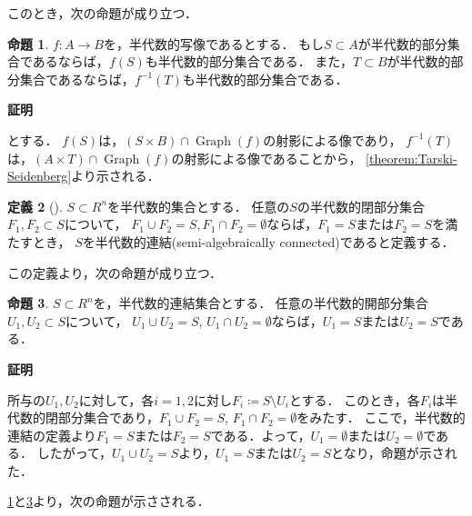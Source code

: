 \documentclass[uplatex, dvipdfmx]{jsarticle}
\makeatletter
\numberwithin{equation}{section}
\renewenvironment{proof}[1][\proofname]{\par
  \pushQED{\qed}%
  \normalfont \topsep6\p@\@plus6\p@\relax
  \trivlist
  \item\relax
  {\bfseries
  #1\@addpunct{.}}\hspace\labelsep\ignorespaces
}{
  \popQED\endtrivlist\@endpefalse
}
\newcommand{\map}[3]{{#1}\colon{#2}\rightarrow{#3}}
\DeclareMathOperator{\Graph}{Graph}
\theoremstyle{definition}
\newtheorem{definition}{定義}[section]
\newtheorem{proposition}[definition]{命題}
\renewcommand{\proofname}{\textbf{証明}}
\makeatother
\begin{document}
このとき，次の命題が成り立つ．

\begin{proposition}\label{proposition:image-preimage}
     $\map{f}{A}{B}$を，半代数的写像であるとする．
     もし$S \subset A$が半代数的部分集合であるならば，$f(S)$も半代数的部分集合である．
     また，$T \subset B$が半代数的部分集合であるならば，$f^{-1}(T)$も半代数的部分集合である．
\end{proposition}

\begin{proof}
     とする．
     $f(S)$は，$(S \times B) \cap \Graph(f)$の射影による像であり，
     $f^{-1}(T)$は，$(A \times T) \cap \Graph(f)$の射影による像であることから，
     \cref{theorem:Tarski-Seidenberg}より示される．
\end{proof}

\begin{definition}[{\cite[Definition 2.4.2]{MR1659509}}]
     $S \subset R^n$を半代数的集合とする．
     任意の$S$の半代数的閉部分集合$F_1, F_2 \subset S$について，
     $F_1 \cup F_2 = S, F_1 \cap F_2 = \emptyset$ならば，$F_1 = S$または$F_2 = S$を満たすとき，
     $S$を半代数的連結(semi-algebraically connected)であると定義する．
\end{definition}

この定義より，次の命題が成り立つ．

\begin{proposition}\label{proposition:connectedness}
     $S \subset R^n$を，半代数的連結集合とする．
     任意の半代数的開部分集合$U_1, U_2 \subset S$について，
     $U_1 \cup U_2 = S$, $U_1 \cap U_2 = \emptyset$ならば，$U_1 = S$または$U_2 = S$である．
\end{proposition}

\begin{proof}
     所与の$U_1, U_2$に対して，各$i=1, 2$に対し$F_i\coloneqq S \setminus U_i$とする．
     このとき，各$F_i$は半代数的閉部分集合であり，$F_1 \cup F_2 = S$, $F_1 \cap F_2 = \emptyset$をみたす．
     ここで，半代数的連結の定義より$F_1 = S$または$F_2 = S$である．よって，$U_1 = \emptyset$または$U_2 = \emptyset$である．
     したがって，$U_1 \cup U_2 = S$より，$U_1 = S$または$U_2 = S$となり，命題が示された．
\end{proof}

\cref{proposition:image-preimage}と\cref{proposition:connectedness}より，次の命題が示さされる．
\end{document}

